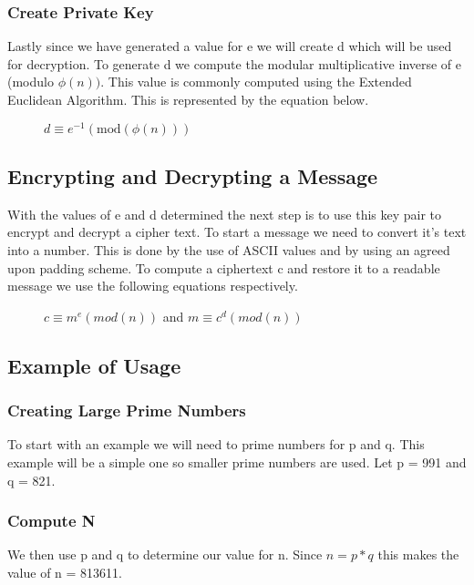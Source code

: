 \documentclass[conference]{IEEEtran}
\begin{document}
\subsubsection{Create Private Key}
Lastly since we have generated a value for e we will create d which will be used for decryption. To generate d we compute the modular multiplicative inverse of e (modulo $ \phi \left(n\right))$. This value is commonly computed using the Extended Euclidean Algorithm. This is represented by the equation below.
\begin{figure}[h]
	\begin{center}
		$d\equiv {e}^{-1}\left(\mathrm{mod}\left(\phi \left(n\right)\right)\right)$
	\end{center}
\end{figure}




\subsection{Encrypting and Decrypting a Message}

With the values of e and d determined the next step is to use this key pair to encrypt and decrypt a cipher text. To start a message we need to convert it's text into a number. This is done by the use of ASCII values and by using an agreed upon padding scheme. To compute a ciphertext c and restore it to a readable message we use the following equations respectively.

\begin{figure}[H]
	\begin{center}
		$c\equiv {m}^{e}\left(mod\left(n\right)\right)$ and
		$m\equiv {c}^{d}\left(mod\left(n\right)\right)$
	\end{center}
\end{figure}

\subsection{Example of Usage}
\subsubsection{Creating Large Prime Numbers}
To start with an example we will need to prime numbers for p and q. This example will be a simple one so smaller prime numbers are used. Let p = 991 and q = 821. 
\subsubsection{Compute N}
We then use p and q to determine our value for n. Since $n = p * q$ this makes the value of n = 813611.
\end{document}
